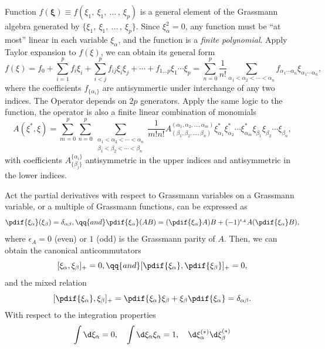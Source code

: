 \begin{solution}\leavevmode
  \begin{enumext}
    \item Function $f(\bm\xi) \equiv f(\xi_1,\ \xi_1,\ \ldots\,,~\xi_p)$ is a general
    element of the Grassmann algebra generated by
    $\{\xi_1,\ \xi_1,\ \ldots\,,~\xi_p\}$. Since $\xi_\alpha^2 = 0$,
    any function must be ``at most'' linear in each variable $\xi_\alpha$, and
    the function is a \emph{finite polynomial}.
    Apply Taylor expansion to $f(\xi)$, we can obtain its general form
    \[
      f(\xi) = f_0 + \sum_{i=1}^p f_i\xi_i
    + \sum_{i<j}^p f_{ij}\xi_i\xi_j + \cdots + f_{1\ldots p} \xi_1\cdots\xi_p
    = \sum_{n=0}^p \frac1{n!} \sum_{\alpha_1<\alpha_2<\cdots<\alpha_n}
      f_{\alpha_1\cdots\alpha_n} \xi_{\alpha_1\cdots\alpha_n},
    \]
    where the coefficients $f_{\{\alpha_i\}}$ are antisymmertic under
    interchange of any two indices.
    The Operator depends on $2p$ generators. Apply the same logic to the
    function, the operator is also a finite linear combination of monomials
    \[
      A(\xi^*, \xi) = \sum_{m = 0}^p \sum_{n = 0}^p
      \sum_{\substack
        {\alpha_1<\alpha_2<\cdots<\alpha_n\\\beta_1<\beta_2<\cdots<\beta_n}}
      \frac1{m!n!}
      A^{(\alpha_1,\alpha_2,\ldots,\alpha_m)}_{(\beta_1,\beta_2,\ldots,\beta_n)}
      \xi_{\alpha_1}^* \xi_{\alpha_2}^* \cdots \xi_{\alpha_m}^*
      \xi_{\beta_1}    \xi_{\beta_2}    \cdots \xi_{\beta_n},
    \]
    with coefficients $A_{\{\beta_j\}}^{\{\alpha_i\}}$ antisymmetric in the
    upper indices and antisymmetric in the lower indices.
    \item Act the partial derivatives with respect to Grassmann variables on a
    Grassmann variable, or a multiple of Grassmann functions, can be expressed as
    \[
      \pdif{\xi_\alpha}(\xi_\beta) = \delta_{\alpha\beta}, \qq{and}
      \pdif{\xi_\alpha} (AB) = (\pdif{\xi_\alpha} A)B
    + (-1)^{\epsilon_A} A (\pdif{\xi_\alpha} B),
    \]
    where $\epsilon_A = 0$ (even) or $1$ (odd) is the Grassmann parity of $A$.
    Then, we can obtain the canonical anticommutators
    \[
      [\xi_\alpha, \xi_\beta]_+ = 0, \qq{and}
      [\pdif{\xi_\alpha}, \pdif{\xi_\beta}]_+ = 0,
    \]
    and the mixed relation
    \[
      [\pdif{\xi_\alpha}, \xi_\beta]_+
    = \pdif{\xi_\alpha} \xi_\beta + \xi_\beta \pdif{\xi_\alpha}
    = \delta_{\alpha\beta}.
    \]
    With respect to the integration properties
    \[
      \int \d\xi_\alpha = 0, \quad \int \d\xi_\alpha \xi_\alpha = 1, \quad
      \d\xi_\alpha^{(*)} \d\xi_\beta^{(*)}
\]
\end{enumext}
\end{solution}
